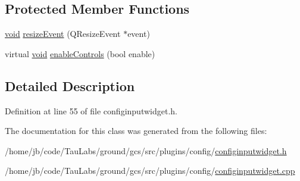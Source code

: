 \subsection*{\-Protected \-Member \-Functions}
\begin{DoxyCompactItemize}
\item 
\hyperlink{group___u_a_v_objects_plugin_ga444cf2ff3f0ecbe028adce838d373f5c}{void} \hyperlink{group___config_plugin_ga46ca6ec855581471ed30c902b43371cf}{resize\-Event} (\-Q\-Resize\-Event $\ast$event)
\item 
virtual \hyperlink{group___u_a_v_objects_plugin_ga444cf2ff3f0ecbe028adce838d373f5c}{void} \hyperlink{group___config_plugin_ga39ced7c878bb56024b9bdd2bdb90d68f}{enable\-Controls} (bool enable)
\end{DoxyCompactItemize}


\subsection{\-Detailed \-Description}


\-Definition at line 55 of file configinputwidget.\-h.



\-The documentation for this class was generated from the following files\-:\begin{DoxyCompactItemize}
\item 
/home/jb/code/\-Tau\-Labs/ground/gcs/src/plugins/config/\hyperlink{configinputwidget_8h}{configinputwidget.\-h}\item 
/home/jb/code/\-Tau\-Labs/ground/gcs/src/plugins/config/\hyperlink{configinputwidget_8cpp}{configinputwidget.\-cpp}\end{DoxyCompactItemize}

